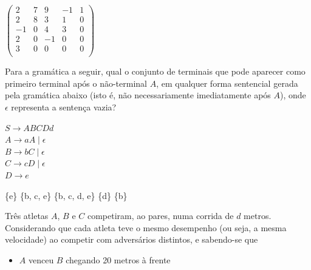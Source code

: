 \documentclass[12pt, addpoints]{exam}
\begin{document}
\begin{questions}
$\begin{pmatrix}

2 & 7 & 9 & -1 & 1 \\

2 & 8 & 3 & 1 & 0 \\

-1 & 0 & 4 & 3 & 0 \\

2 & 0 & -1 & 0 & 0 \\

3 & 0 & 0 & 0 & 0 \\

\end{pmatrix}$
\begin{choices}
\end{choices}

\question

Para a gramática a seguir, qual o conjunto de terminais que pode aparecer como primeiro terminal após o não-terminal \( A \), em qualquer forma sentencial gerada pela gramática abaixo (isto é, não necessariamente imediatamente após \( A \)), onde \( \epsilon \) representa a sentença vazia?



$S \rightarrow ABCDd$\\

$A \rightarrow aA \mid \epsilon$\\

$B \rightarrow bC \mid \epsilon$\\

$C \rightarrow cD \mid \epsilon$\\

$D \rightarrow e$\\
\begin{choices}
\choice \{e\}
\choice \{b, c, e\}
\choice \{b, c, d, e\}
\choice \{d\}
\choice \{b\}
\end{choices}

\question

Três atletas \( A \), \( B \) e \( C \) competiram, ao pares, numa corrida de \( d \) metros. Considerando que cada atleta teve o mesmo desempenho (ou seja, a mesma velocidade) ao competir com adversários distintos, e sabendo-se que



\begin{itemize}

    \item \( A \) venceu \( B \) chegando 20 metros à frente


\end{itemize}
\end{questions}
\end{document}
